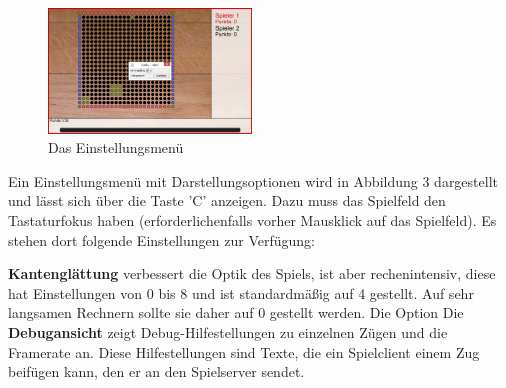 \documentclass[a4paper, ngerman]{scrartcl}
\begin{document}
\begin{figure}
  \includegraphics[width=0.48\textwidth]{bilder/konfiguration.png}
  \centering
  \caption{Das Einstellungsmenü}\label{fig:Configuration}
\end{figure}

Ein Einstellungsmenü mit Darstellungsoptionen wird in Abbildung 3
dargestellt und lässt sich über die Taste 'C' anzeigen. Dazu muss das
Spielfeld den Tastaturfokus haben (erforderlichenfalls vorher
Mausklick auf das Spielfeld). Es stehen dort folgende Einstellungen
zur Verfügung:

\textbf{Kantenglättung} verbessert die Optik des
Spiels, ist aber rechenintensiv, diese hat Einstellungen von 0 bis 8 und ist
standardmäßig auf 4 gestellt.
Auf sehr langsamen Rechnern sollte sie daher auf 0 gestellt werden. Die Option
Die \textbf{Debugansicht} zeigt Debug-Hilfestellungen zu einzelnen Zügen und
die Framerate an.
Diese Hilfestellungen sind Texte, die ein Spielclient einem Zug beifügen kann, den er
an den Spielserver sendet.
\end{document}
